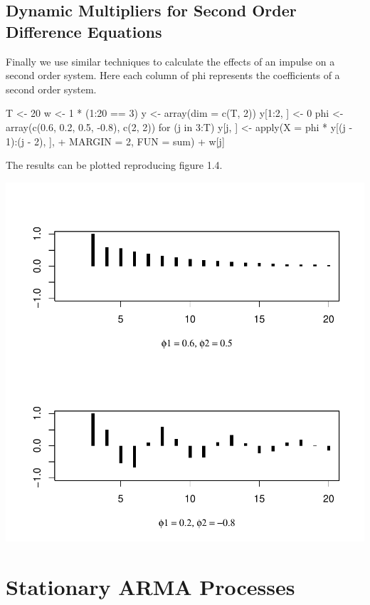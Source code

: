 \documentclass[a4paper]{article}
\begin{document}
\subsection{Dynamic Multipliers for Second Order Difference Equations}
Finally we use similar techniques to calculate the effects of an impulse on a second order system.
Here each column of phi represents the coefficients of a second order system.
\begin{Schunk}
\begin{Sinput}
 T <- 20
 w <- 1 * (1:20 == 3)
 y <- array(dim = c(T, 2))
 y[1:2, ] <- 0
 phi <- array(c(0.6, 0.2, 0.5, -0.8), c(2, 2))
 for (j in 3:T) y[j, ] <- apply(X = phi * y[(j - 1):(j - 2), ], 
+     MARGIN = 2, FUN = sum) + w[j]
\end{Sinput}
\end{Schunk}
The results can be plotted reproducing figure 1.4.
\begin{center}
\includegraphics{Companion-012}
\end{center}
\section{Stationary ARMA Processes}
\end{document}

